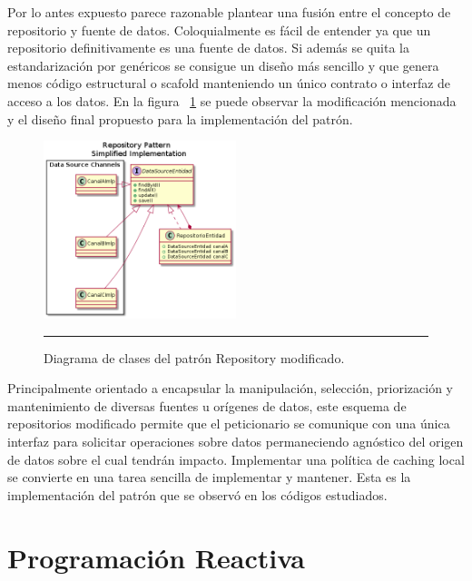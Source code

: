 Por lo antes expuesto parece razonable plantear una fusión entre el concepto de repositorio y fuente de datos. Coloquialmente es fácil de entender ya que un repositorio definitivamente es una fuente de datos. Si además se quita la estandarización por genéricos se consigue un diseño más sencillo y que genera menos código estructural o scafold manteniendo un único contrato o interfaz de acceso a los datos. En la figura ~\ref{fig:uml_clases_modif_repository} se puede observar la modificación mencionada y el diseño final propuesto para la implementación del patrón.


\begin{figure}[htbp]
	\centering
	\includegraphics[width=0.5\textwidth]{Figures/uml_clases_modif_repository.png}
	\rule{35em}{1pt}
	\caption[Modified Repository Pattern Class Diagram]{Diagrama de clases del patrón Repository modificado.}
	\label{fig:uml_clases_modif_repository}
\end{figure}

Principalmente orientado a encapsular la manipulación, selección, priorización y mantenimiento de diversas fuentes u orígenes de datos, este esquema de repositorios modificado permite que el peticionario se comunique con una única interfaz para solicitar operaciones sobre datos permaneciendo agnóstico del origen de datos sobre el cual tendrán impacto. 
Implementar una política de caching local se convierte en una tarea sencilla de implementar y mantener.
Esta es la implementación del patrón que se observó en los códigos estudiados.

\section{Programación Reactiva}

